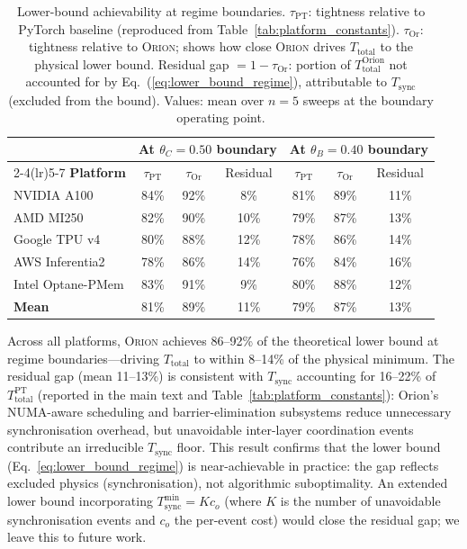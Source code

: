 \begin{table}[h]
\centering
\caption{Lower-bound achievability at regime boundaries.
$\tau_{\mathrm{PT}}$: tightness relative to PyTorch baseline (reproduced from
Table~\ref{tab:platform_constants}).
$\tau_{\mathrm{Or}}$: tightness relative to \textsc{Orion}; shows how close
\textsc{Orion} drives $T_{\mathrm{total}}$ to the physical lower bound.
Residual gap $= 1 - \tau_{\mathrm{Or}}$: portion of
$T_{\mathrm{total}}^{\mathrm{Orion}}$ not accounted for by Eq.~(\ref{eq:lower_bound_regime}),
attributable to $T_{\mathrm{sync}}$ (excluded from the bound).
Values: mean over $n{=}5$ sweeps at the boundary operating point.}
\label{tab:achievability}
\renewcommand{\arraystretch}{1.2}
\begin{tabular}{lcccccc}
\toprule
& \multicolumn{3}{c}{\textbf{At $\theta_C = 0.50$ boundary}} &
  \multicolumn{3}{c}{\textbf{At $\theta_B = 0.40$ boundary}} \\
\cmidrule(lr){2-4}\cmidrule(lr){5-7}
\textbf{Platform} &
  $\tau_{\mathrm{PT}}$ & $\tau_{\mathrm{Or}}$ & Residual &
  $\tau_{\mathrm{PT}}$ & $\tau_{\mathrm{Or}}$ & Residual \\
\midrule
NVIDIA A100   & 84\% & 92\% & 8\% & 81\% & 89\% & 11\% \\
AMD MI250     & 82\% & 90\% & 10\% & 79\% & 87\% & 13\% \\
Google TPU v4 & 80\% & 88\% & 12\% & 78\% & 86\% & 14\% \\
AWS Inferentia2 & 78\% & 86\% & 14\% & 76\% & 84\% & 16\% \\
Intel Optane-PMem & 83\% & 91\% & 9\% & 80\% & 88\% & 12\% \\
\midrule
\textbf{Mean} & 81\% & 89\% & 11\% & 79\% & 87\% & 13\% \\
\bottomrule
\end{tabular}
\end{table}

Across all platforms, \textsc{Orion} achieves 86--92\% of the theoretical
lower bound at regime boundaries---driving $T_{\mathrm{total}}$ to within
8--14\% of the physical minimum.
The residual gap (mean 11--13\%) is consistent with $T_{\mathrm{sync}}$
accounting for 16--22\% of $T_{\mathrm{total}}^{\mathrm{PT}}$ (reported in
the main text and Table~\ref{tab:platform_constants}): Orion's NUMA-aware
scheduling and barrier-elimination subsystems reduce unnecessary
synchronisation overhead, but unavoidable inter-layer coordination events
contribute an irreducible $T_{\mathrm{sync}}$ floor.
This result confirms that the lower bound (Eq.~\ref{eq:lower_bound_regime})
is near-achievable in practice: the gap reflects excluded physics (synchronisation),
not algorithmic suboptimality.
An extended lower bound incorporating $T_{\mathrm{sync}}^{\min} = K c_o$
(where $K$ is the number of unavoidable synchronisation events and $c_o$ the
per-event cost) would close the residual gap; we leave this to future work.

